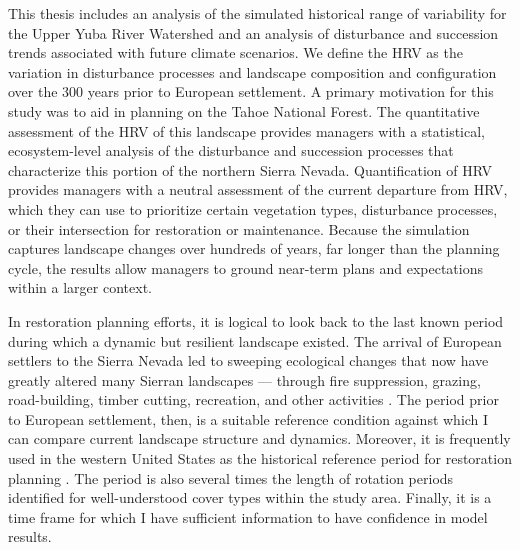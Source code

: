 This thesis includes an analysis of the simulated historical range of variability for the Upper Yuba River Watershed and an analysis of disturbance and succession trends associated with future climate scenarios. We define the HRV as the variation in disturbance processes and landscape composition and configuration over the 300 years prior to European settlement. A primary motivation for this study was to aid in planning on the Tahoe National Forest. The quantitative assessment of the HRV of this landscape provides managers with a statistical, ecosystem-level analysis of the disturbance and succession processes that characterize this portion of the northern Sierra Nevada. Quantification of HRV provides managers with a neutral assessment of the current departure from HRV, which they can use to prioritize certain vegetation types, disturbance processes, or their intersection for restoration or maintenance. Because the simulation captures landscape changes over hundreds of years, far longer than the planning cycle, the results allow managers to ground near-term plans and expectations within a larger context. 

In restoration planning efforts, it is logical to look back to the last known period during which a dynamic but resilient landscape existed. The arrival of European settlers to the Sierra Nevada led to sweeping ecological changes that now have greatly altered many Sierran landscapes --- through fire suppression, grazing, road-building, timber cutting, recreation, and other activities \citep{Storer1963,Stephens2015,Knapp2013,Hessburg2005}. The period prior to European settlement, then, is a suitable reference condition against which I can compare current landscape structure and dynamics. Moreover, it is frequently used in the western United States as the historical reference period for restoration planning \citep{VandeWater2011,Safford2013,Meyer2013}. The period is also several times the length of rotation periods identified for well-understood cover types within the study area. Finally, it is a time frame for which I have sufficient information to have confidence in model results. 

